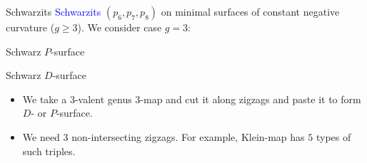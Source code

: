 \documentclass[%
pdf,
colorBG,
slideColor,
]{prosper}
\begin{document}
\begin{slide}{Schwarzits}
\vspace{-3mm}
\textcolor{blue}{Schwarzits} $(p_6, p_7, p_8)$ on minimal surfaces of constant negative curvature ($g\geq 3$). We consider case $g=3$:\\

\begin{center}
\begin{minipage}[b]{5.5cm}
\centering
{}\par
Schwarz $P$-surface
\end{minipage}
\begin{minipage}[b]{5.5cm}
\centering
{}\par
Schwarz $D$-surface
\end{minipage}
\end{center}

\begin{itemize}
\item We take a $3$-valent genus $3$-map and cut it along zigzags  and paste it to form $D$- or $P$-surface.
\item We need $3$ non-intersecting zigzags. For example, Klein-map has $5$ types of such triples.
\end{itemize}



\end{slide}





\end{document}
